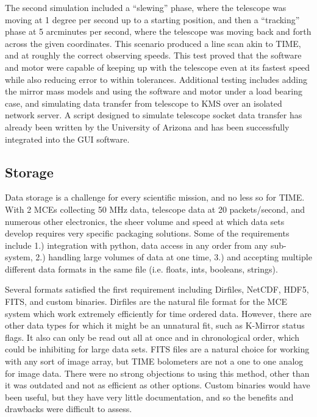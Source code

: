 \documentclass[manuscript]{aastex}
\begin{document}
The second simulation included a ``slewing'' phase, where the telescope was moving at 1 degree per second up to a starting position, and then a ``tracking'' phase at 5 arcminutes per second, where the telescope was moving back and forth across the given coordinates. This scenario produced a line scan akin to TIME, and at roughly the correct observing speeds. This test proved that the software and motor were capable of keeping up with the telescope even at its fastest speed while also reducing error to within tolerances.  Additional testing includes adding the mirror mass models and using the software and motor under a load bearing case, and simulating data transfer from telescope to KMS over an isolated network server. A script designed to simulate telescope socket data transfer has already been written by the University of Arizona and has been successfully integrated into the GUI software. 
\subsection{\textbf{Storage}}

Data storage is a challenge for every scientific mission, and no less so for TIME. With 2 MCEs collecting 50 MHz data, telescope data at 20 packets/second, and numerous other electronics, the sheer volume and speed at which data sets develop requires very specific packaging solutions. Some of the requirements include 1.) integration with python, data access in any order from any sub-system, 2.) handling large volumes of data at one time, 3.) and accepting multiple different data formats in the same file (i.e. floats, ints, booleans, strings). 

Several formats satisfied the first requirement including Dirfiles, NetCDF, HDF5, FITS, and custom binaries. Dirfiles are the natural file format for the MCE system which work extremely efficiently for time ordered data. However, there are other data types for which it might be an unnatural fit, such as K-Mirror status flags. It also can only be read out all at once and in chronological order, which could be inhibiting for large data sets. FITS files are a natural choice for working with any sort of image array, but TIME bolometers are not a one to one analog for image data. There were no strong objections to using this method, other than it was outdated and not as efficient as other options. Custom binaries would have been useful, but they have very little documentation, and so the benefits and drawbacks were difficult to assess. 
\end{document}
